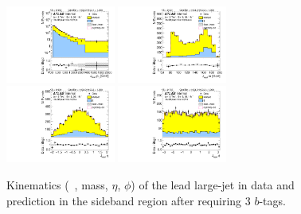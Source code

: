 \clearpage

\begin{figure}[htbp!]
\begin{center}
\includegraphics[width=0.32\textwidth,angle=-90]{figures/boosted/Sideband/b77_ThreeTag_Sideband_leadHCand_Pt_m_1.pdf}
\includegraphics[width=0.32\textwidth,angle=-90]{figures/boosted/Sideband/b77_ThreeTag_Sideband_leadHCand_Mass_s.pdf}\\
\includegraphics[width=0.32\textwidth,angle=-90]{figures/boosted/Sideband/b77_ThreeTag_Sideband_leadHCand_Eta.pdf}
\includegraphics[width=0.32\textwidth,angle=-90]{figures/boosted/Sideband/b77_ThreeTag_Sideband_leadHCand_Phi.pdf}
  \caption{Kinematics (\pt~, mass, $\eta$, $\phi$) of the lead large-\R jet in data and prediction in the sideband region after requiring 3 $b$-tags.}
  \label{fig:boosted-3b-sideband-ak10-lead}
\end{center}
\end{figure}

